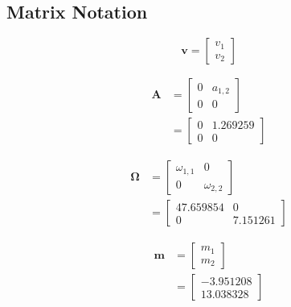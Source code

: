 \documentclass[
]{book}
\begin{document}
\hypertarget{matrix-notation-1}{%
\subsection{Matrix Notation}\label{matrix-notation-1}}

\begin{equation}
  \mathbf{v}
  =
  \begin{bmatrix}
    v_1 \\
    v_2
  \end{bmatrix}
\end{equation}

\begin{equation}
  \begin{split}
    \mathbf{A}
    &=
    \begin{bmatrix}
      0 & a_{1, 2} \\
      0 & 0
    \end{bmatrix} \\
    &=
    \begin{bmatrix}
      0 & 1.269259 \\
      0 & 0
    \end{bmatrix}
  \end{split}
\end{equation}

\begin{equation}
  \begin{split}
    \boldsymbol{\Omega}
    &=
    \begin{bmatrix}
      \omega_{1, 1} & 0             \\
      0             & \omega_{2, 2}
    \end{bmatrix} \\
    &=
    \begin{bmatrix}
      47.659854 & 0 \\
      0 & 7.151261
    \end{bmatrix}
  \end{split}
\end{equation}

\begin{equation}
  \begin{split}
    \mathbf{m}
    &=
    \begin{bmatrix}
      m_1 \\
      m_2
    \end{bmatrix} \\
    &=
    \begin{bmatrix}
      -3.951208 \\
      13.038328
    \end{bmatrix}
  \end{split}
\end{equation}
\end{document}
